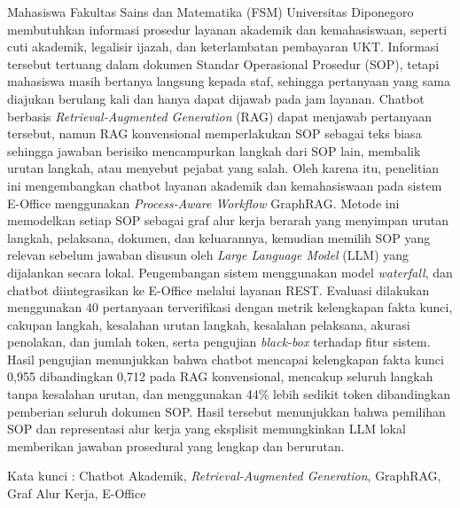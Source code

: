\begingroup{}\setlength{\parindent}{0pt}
Mahasiswa Fakultas Sains dan Matematika (FSM) Universitas Diponegoro membutuhkan informasi prosedur layanan akademik dan kemahasiswaan, seperti cuti akademik, legalisir ijazah, dan keterlambatan pembayaran UKT. Informasi tersebut tertuang dalam dokumen Standar Operasional Prosedur (SOP), tetapi mahasiswa masih bertanya langsung kepada staf, sehingga pertanyaan yang sama diajukan berulang kali dan hanya dapat dijawab pada jam layanan. Chatbot berbasis \textit{Retrieval-Augmented Generation} (RAG) dapat menjawab pertanyaan tersebut, namun RAG konvensional memperlakukan SOP sebagai teks biasa sehingga jawaban berisiko mencampurkan langkah dari SOP lain, membalik urutan langkah, atau menyebut pejabat yang salah. Oleh karena itu, penelitian ini mengembangkan chatbot layanan akademik dan kemahasiswaan pada sistem E-Office menggunakan \textit{Process-Aware Workflow} GraphRAG. Metode ini memodelkan setiap SOP sebagai graf alur kerja berarah yang menyimpan urutan langkah, pelaksana, dokumen, dan keluarannya, kemudian memilih SOP yang relevan sebelum jawaban disusun oleh \textit{Large Language Model} (LLM) yang dijalankan secara lokal. Pengembangan sistem menggunakan model \textit{waterfall}, dan chatbot diintegrasikan ke E-Office melalui layanan REST. Evaluasi dilakukan menggunakan 40 pertanyaan terverifikasi dengan metrik kelengkapan fakta kunci, cakupan langkah, kesalahan urutan langkah, kesalahan pelaksana, akurasi penolakan, dan jumlah token, serta pengujian \textit{black-box} terhadap fitur sistem. Hasil pengujian menunjukkan bahwa chatbot mencapai kelengkapan fakta kunci 0,955 dibandingkan 0,712 pada RAG konvensional, mencakup seluruh langkah tanpa kesalahan urutan, dan menggunakan 44\% lebih sedikit token dibandingkan pemberian seluruh dokumen SOP. Hasil tersebut menunjukkan bahwa pemilihan SOP dan representasi alur kerja yang eksplisit memungkinkan LLM lokal memberikan jawaban prosedural yang lengkap dan berurutan.

\vspace{12pt}
\noindent Kata kunci : Chatbot Akademik, \textit{Retrieval-Augmented Generation}, GraphRAG, Graf Alur Kerja, E-Office
\par\endgroup
\clearpage
